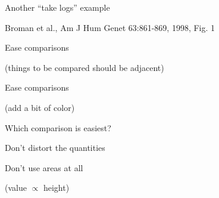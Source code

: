 \documentclass[aspectratio=169,12pt,t]{beamer}
\begin{document}
\begin{frame}[c]{Another ``{\hilit take logs}'' example}


\vfill \hfill \footnotesize \lolit
Broman et al., Am J Hum Genet 63:861-869, 1998, Fig. 1

\note{
  }
\end{frame}





\begin{frame}{Ease comparisons}

\hilit (things to be compared should be adjacent)

\bigskip


\note{
}
\end{frame}





\begin{frame}{Ease comparisons}

\hilit (add a bit of color)

\bigskip


\note{
}
\end{frame}




\begin{frame}[c]{Which comparison is easiest?}


\note{
}
\end{frame}


\begin{frame}{Don't distort the quantities}

{\hilit
}

\bigskip


\note{
}
\end{frame}



\begin{frame}{Don't use areas at all}

{\hilit
  (value $\propto$ height)
}

\bigskip


\note{
}
\end{frame}
\end{document}
